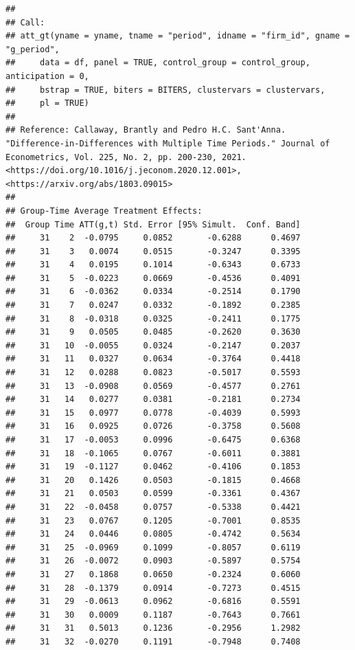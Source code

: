 \documentclass[
]{article}
\begin{document}
\begin{verbatim}
## 
## Call:
## att_gt(yname = yname, tname = "period", idname = "firm_id", gname = "g_period", 
##     data = df, panel = TRUE, control_group = control_group, anticipation = 0, 
##     bstrap = TRUE, biters = BITERS, clustervars = clustervars, 
##     pl = TRUE)
## 
## Reference: Callaway, Brantly and Pedro H.C. Sant'Anna.  "Difference-in-Differences with Multiple Time Periods." Journal of Econometrics, Vol. 225, No. 2, pp. 200-230, 2021. <https://doi.org/10.1016/j.jeconom.2020.12.001>, <https://arxiv.org/abs/1803.09015> 
## 
## Group-Time Average Treatment Effects:
##  Group Time ATT(g,t) Std. Error [95% Simult.  Conf. Band] 
##     31    2  -0.0795     0.0852       -0.6288      0.4697 
##     31    3   0.0074     0.0515       -0.3247      0.3395 
##     31    4   0.0195     0.1014       -0.6343      0.6733 
##     31    5  -0.0223     0.0669       -0.4536      0.4091 
##     31    6  -0.0362     0.0334       -0.2514      0.1790 
##     31    7   0.0247     0.0332       -0.1892      0.2385 
##     31    8  -0.0318     0.0325       -0.2411      0.1775 
##     31    9   0.0505     0.0485       -0.2620      0.3630 
##     31   10  -0.0055     0.0324       -0.2147      0.2037 
##     31   11   0.0327     0.0634       -0.3764      0.4418 
##     31   12   0.0288     0.0823       -0.5017      0.5593 
##     31   13  -0.0908     0.0569       -0.4577      0.2761 
##     31   14   0.0277     0.0381       -0.2181      0.2734 
##     31   15   0.0977     0.0778       -0.4039      0.5993 
##     31   16   0.0925     0.0726       -0.3758      0.5608 
##     31   17  -0.0053     0.0996       -0.6475      0.6368 
##     31   18  -0.1065     0.0767       -0.6011      0.3881 
##     31   19  -0.1127     0.0462       -0.4106      0.1853 
##     31   20   0.1426     0.0503       -0.1815      0.4668 
##     31   21   0.0503     0.0599       -0.3361      0.4367 
##     31   22  -0.0458     0.0757       -0.5338      0.4421 
##     31   23   0.0767     0.1205       -0.7001      0.8535 
##     31   24   0.0446     0.0805       -0.4742      0.5634 
##     31   25  -0.0969     0.1099       -0.8057      0.6119 
##     31   26  -0.0072     0.0903       -0.5897      0.5754 
##     31   27   0.1868     0.0650       -0.2324      0.6060 
##     31   28  -0.1379     0.0914       -0.7273      0.4515 
##     31   29  -0.0613     0.0962       -0.6816      0.5591 
##     31   30   0.0009     0.1187       -0.7643      0.7661 
##     31   31   0.5013     0.1236       -0.2956      1.2982 
##     31   32  -0.0270     0.1191       -0.7948      0.7408 

\end{verbatim}
\end{document}
